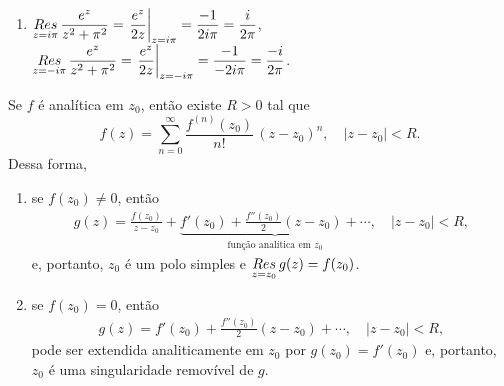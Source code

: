 \begin{questions}
\begin{solution}
\begin{enumerate}[label=(\alph*)]
      \item $\displaystyle \mathop{Res}\limits_{z=i\pi} \frac{e^{z}}{z^2 + \pi^2} = \left. \frac{e^{z}}{2z} \right|_{z=i\pi} = \frac{-1}{2i\pi} = \frac{i}{2\pi}$,\\
      $\displaystyle \mathop{Res}\limits_{z=-i\pi} \frac{e^{z}}{z^2 + \pi^2} = \left. \frac{e^{z}}{2z} \right|_{z=-i\pi} = \frac{-1}{-2i\pi} = \frac{-i}{2\pi}$.
   \end{enumerate}
\end{solution}

%
\begin{solution}
    Se $f$ é analítica em $z_0$, então existe $R>0$ tal que
    \[f(z) = \sum_{n=0}^\infty \frac{f^{(n)}(z_0)}{n!}\,(z-z_0)^n, \quad |z-z_0| < R.\]
    Dessa forma,
\begin{enumerate}[label=(\alph*)]
    \item se $f(z_0) \neq 0$, então
    \begin{align*}
        g(z) = \frac{f(z_0)}{z-z_0} + \underbrace{f'(z_0) + \frac{f''(z_0)}{2}(z-z_0) + \cdots}_{\text{função analítica em }z_0}, \quad |z-z_0| < R,
    \end{align*}
    e, portanto, $z_0$ é um polo simples e $\mathop{Res}\limits_{z=z_0} g(z) = f(z_0)$.
    
    \item se $f(z_0) = 0$, então
    \begin{align*}
        g(z) = f'(z_0) + \frac{f''(z_0)}{2}(z-z_0) + \cdots, \quad |z-z_0| < R,
    \end{align*}
    pode ser extendida analiticamente em $z_0$ por $g(z_0) = f'(z_0)$ e, portanto, $z_0$ é uma singularidade removível de $g$.
\end{enumerate}
\end{solution}



\end{questions}
